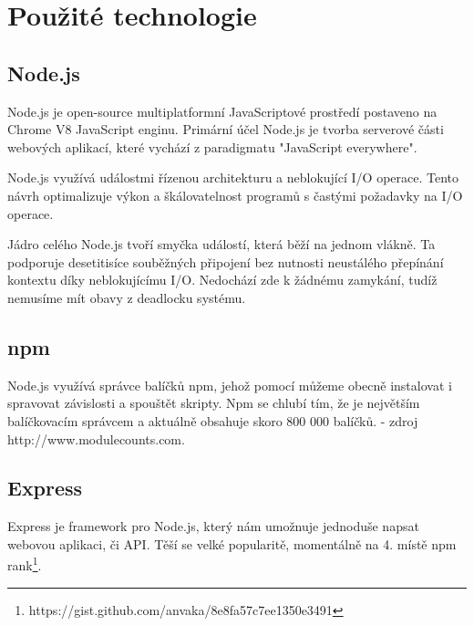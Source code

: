 \documentclass[thesis=B,czech]{FITthesis}[2012/06/26]
\begin{document}
    \section{Použité technologie}
        \subsection{Node.js}
            Node.js je open-source multiplatformní JavaScriptové prostředí postaveno na Chrome V8 JavaScript enginu. Primární účel Node.js je tvorba serverové části webových aplikací, které vychází z paradigmatu "JavaScript everywhere".
            
            Node.js využívá událostmi řízenou architekturu a neblokující I/O operace. Tento návrh optimalizuje výkon a škálovatelnost programů s častými požadavky na I/O operace.
            
            Jádro celého Node.js tvoří smyčka událostí, která běží na jednom vlákně. Ta podporuje desetitisíce souběžných připojení bez nutnosti neustálého přepínání kontextu díky neblokujícímu I/O. Nedochází zde k žádnému zamykání, tudíž nemusíme mít obavy z deadlocku systému.
        \subsection{npm}
            Node.js využívá správce balíčků npm, jehož pomocí můžeme obecně instalovat i spravovat závislosti a spouštět skripty. Npm se chlubí tím, že je největším balíčkovacím správcem a aktuálně obsahuje skoro 800 000 balíčků. - zdroj http://www.modulecounts.com.
        \subsection{Express}
            Express je framework pro Node.js, který nám umožnuje jednoduše napsat webovou aplikaci, či API. Těší se velké popularitě, momentálně na 4. místě npm rank\footnote{https://gist.github.com/anvaka/8e8fa57c7ee1350e3491}.
\end{document}
